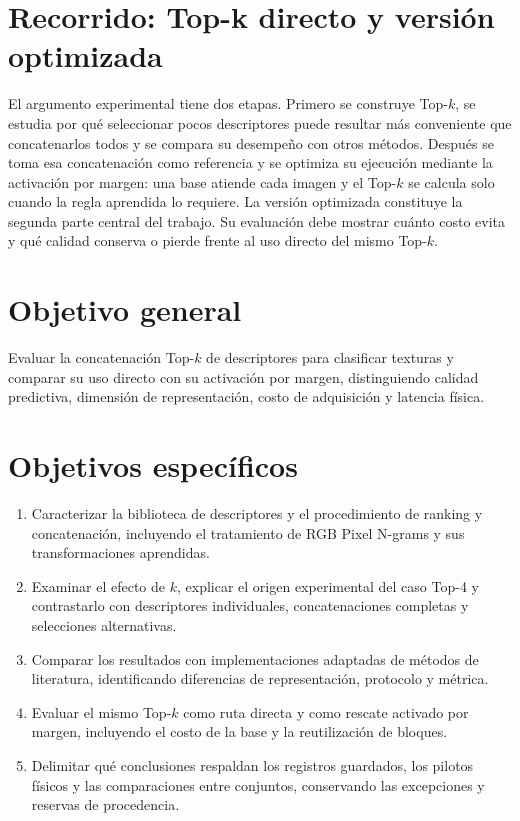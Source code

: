 \section{Recorrido: Top-k directo y versión optimizada}
El argumento experimental tiene dos etapas. Primero se construye Top-\(k\), se estudia por qué seleccionar pocos descriptores puede resultar más conveniente que concatenarlos todos y se compara su desempeño con otros métodos. Después se toma esa concatenación como referencia y se optimiza su ejecución mediante la activación por margen: una base atiende cada imagen y el Top-\(k\) se calcula solo cuando la regla aprendida lo requiere. La versión optimizada constituye la segunda parte central del trabajo. Su evaluación debe mostrar cuánto costo evita y qué calidad conserva o pierde frente al uso directo del mismo Top-\(k\).

\section{Objetivo general}
Evaluar la concatenación Top-\(k\) de descriptores para clasificar texturas y comparar su uso directo con su activación por margen, distinguiendo calidad predictiva, dimensión de representación, costo de adquisición y latencia física.

\section{Objetivos específicos}
\begin{enumerate}
\item Caracterizar la biblioteca de descriptores y el procedimiento de ranking y concatenación, incluyendo el tratamiento de RGB Pixel N-grams y sus transformaciones aprendidas.
\item Examinar el efecto de \(k\), explicar el origen experimental del caso Top-4 y contrastarlo con descriptores individuales, concatenaciones completas y selecciones alternativas.
\item Comparar los resultados con implementaciones adaptadas de métodos de literatura, identificando diferencias de representación, protocolo y métrica.
\item Evaluar el mismo Top-\(k\) como ruta directa y como rescate activado por margen, incluyendo el costo de la base y la reutilización de bloques.
\item Delimitar qué conclusiones respaldan los registros guardados, los pilotos físicos y las comparaciones entre conjuntos, conservando las excepciones y reservas de procedencia.
\end{enumerate}

